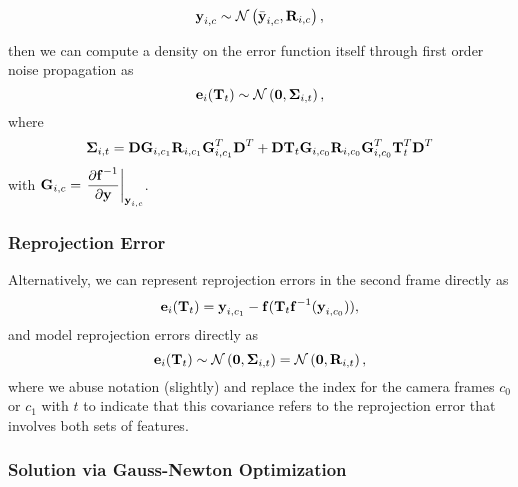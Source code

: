 \begin{equation}
\boldsymbol{\mathbf{y}}_{i, c} \sim \mathcal{N}\left(\bar{\boldsymbol{\mathbf{y}}}_{i,c}, \boldsymbol{\mathbf{R}}_{i,c} \right), 
\end{equation}  

then we can compute a density on the error function itself through first order noise propagation as
 \begin{equation}
  \boldsymbol{\mathbf{e}}_{i}(\boldsymbol{\mathbf{T}}_t) \sim
 \mathcal{N}\left(\boldsymbol{\mathbf{0}}, \boldsymbol{\mathbf{\Sigma}}_{i,t} \right), 
\end{equation}
where
\begin{equation}
	\boldsymbol{\mathbf{\Sigma}}_{i,t} = \boldsymbol{\mathbf{D}}\boldsymbol{\mathbf{G}}_{i,c_1} \boldsymbol{\mathbf{R}}_{i,c_1}  \boldsymbol{\mathbf{G}}_{i,c_1}^T \boldsymbol{\mathbf{D}}^T + 
 \boldsymbol{\mathbf{D}}\boldsymbol{\mathbf{T}}_t \boldsymbol{\mathbf{G}}_{i,c_0}  \boldsymbol{\mathbf{R}}_{i,c_0} \boldsymbol{\mathbf{G}}_{i,c_0}^T  \boldsymbol{\mathbf{T}}_t^T \boldsymbol{\mathbf{D}}^T
\end{equation}
with
$\boldsymbol{\mathbf{G}}_{i,c} = \left.\dfrac{\partial \boldsymbol{\mathbf{f}}^{-1}}{\partial \boldsymbol{\mathbf{y}}}\right|_{\boldsymbol{\mathbf{y}}_{i, c}}$.

\subsubsection{Reprojection Error}
\label{sec:vo_reprojection}

Alternatively, we can represent reprojection errors in the second frame directly as
\begin{equation}
  \boldsymbol{\mathbf{e}}_{i}(\boldsymbol{\mathbf{T}}_t)  = \boldsymbol{\mathbf{y}}_{i, c_1} - \boldsymbol{\mathbf{f}}( \boldsymbol{\mathbf{T}}_t 
    \boldsymbol{\mathbf{f}}^{-1}( \boldsymbol{\mathbf{y}}_{i, c_0} ) ),
   \label{eq:image_error}
\end{equation}
\noindent and model reprojection errors directly as 
 \begin{equation}
  \boldsymbol{\mathbf{e}}_{i}(\boldsymbol{\mathbf{T}}_t) \sim \mathcal{N}\left(\boldsymbol{\mathbf{0}}, \boldsymbol{\mathbf{\Sigma}}_{i,t} \right) = 
 \mathcal{N}\left(\boldsymbol{\mathbf{0}},  \boldsymbol{\mathbf{R}}_{i,t}\right), 
\end{equation}
where we abuse notation (slightly) and replace the index for the camera frames $c_0$ or $c_1$ with $t$ to indicate that this covariance refers to the reprojection error that involves both sets of features.

\subsubsection{Solution via Gauss-Newton Optimization}


